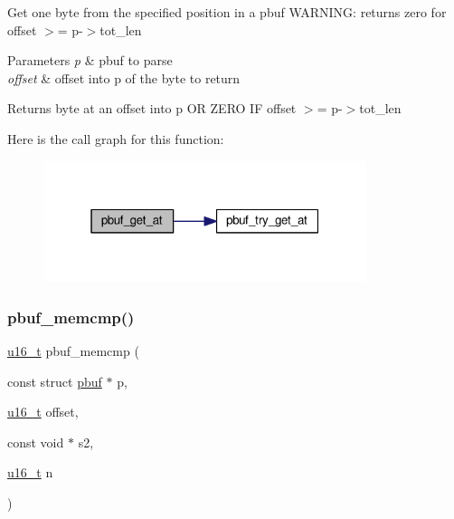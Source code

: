 Get one byte from the specified position in a pbuf W\+A\+R\+N\+I\+NG\+: returns zero for offset $>$= p-\/$>$tot\+\_\+len


\begin{DoxyParams}{Parameters}
{\em p} & pbuf to parse \\
\hline
{\em offset} & offset into p of the byte to return \\
\hline
\end{DoxyParams}
\begin{DoxyReturn}{Returns}
byte at an offset into p OR Z\+E\+RO IF \textquotesingle{}offset\textquotesingle{} $>$= p-\/$>$tot\+\_\+len 
\end{DoxyReturn}
Here is the call graph for this function\+:
\nopagebreak
\begin{figure}[H]
\begin{center}
\leavevmode
\includegraphics[width=268pt]{group__pbuf_ga6d803d9945bffb7ad97743f2fa503da6_cgraph}
\end{center}
\end{figure}
\mbox{\label{group__pbuf_ga2170ccbbb13238380dbb203ee1b85974}} 
\subsubsection{\texorpdfstring{pbuf\+\_\+memcmp()}{pbuf\_memcmp()}}
{\footnotesize\ttfamily \hyperlink{group__compiler__abstraction_ga77570ac4fcab86864fa1916e55676da2}{u16\+\_\+t} pbuf\+\_\+memcmp (\begin{DoxyParamCaption}\item[{const struct \hyperlink{structpbuf}{pbuf} $\ast$}]{p,  }\item[{\hyperlink{group__compiler__abstraction_ga77570ac4fcab86864fa1916e55676da2}{u16\+\_\+t}}]{offset,  }\item[{const void $\ast$}]{s2,  }\item[{\hyperlink{group__compiler__abstraction_ga77570ac4fcab86864fa1916e55676da2}{u16\+\_\+t}}]{n }\end{DoxyParamCaption})}

